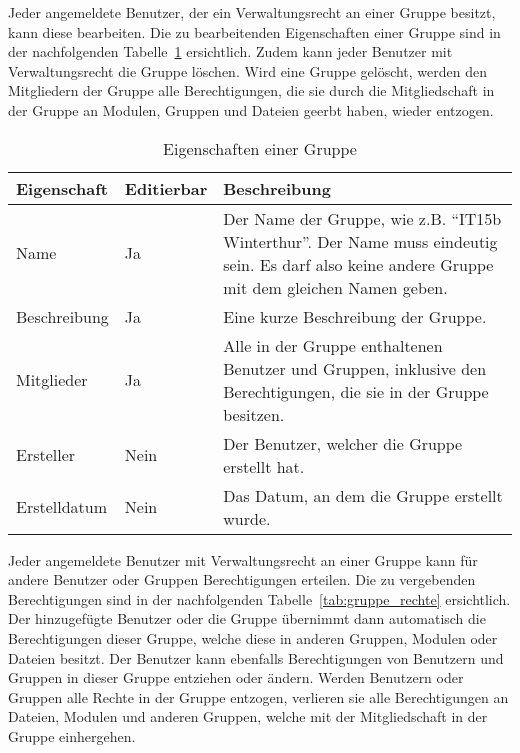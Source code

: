 Jeder angemeldete Benutzer, der ein Verwaltungsrecht an einer Gruppe besitzt, kann diese bearbeiten. Die zu bearbeitenden Eigenschaften einer Gruppe sind in der nachfolgenden Tabelle~\ref{tab:gruppe_eigenschaften} ersichtlich. Zudem kann jeder Benutzer mit Verwaltungsrecht die Gruppe löschen. Wird eine Gruppe gelöscht, werden den Mitgliedern der Gruppe alle Berechtigungen, die sie durch die Mitgliedschaft in der Gruppe an Modulen, Gruppen und Dateien geerbt haben, wieder entzogen.

\begin{table}[H]
\begin{tabularx}{\textwidth}{|l|l|X|} \hline
\textbf{Eigenschaft} &\textbf{Editierbar} & \textbf{Beschreibung} \\ \hline
Name				& Ja 	& Der Name der Gruppe, wie z.B. “IT15b Winterthur”. Der Name muss eindeutig sein. Es darf also keine andere Gruppe mit dem gleichen Namen geben.\\ \hline
Beschreibung		& Ja 	& Eine kurze Beschreibung der Gruppe.\\ \hline
Mitglieder			& Ja 	& Alle in der Gruppe enthaltenen Benutzer und Gruppen, inklusive den Berechtigungen, die sie in der Gruppe besitzen.\\ \hline
Ersteller	 		& Nein 	& Der Benutzer, welcher die Gruppe erstellt hat.\\ \hline
Erstelldatum		& Nein 	& Das Datum, an dem die Gruppe erstellt wurde.\\ \hline
\end{tabularx}
\caption{Eigenschaften einer Gruppe}
\label{tab:gruppe_eigenschaften}
\end{table}

Jeder angemeldete Benutzer mit Verwaltungsrecht  an einer Gruppe kann für andere Benutzer oder Gruppen  Berechtigungen erteilen.
Die zu vergebenden Berechtigungen sind in der nachfolgenden Tabelle~\ref{tab:gruppe_rechte} ersichtlich.
Der hinzugefügte Benutzer oder die Gruppe  übernimmt dann automatisch die Berechtigungen dieser Gruppe, welche diese in anderen Gruppen, Modulen oder Dateien besitzt.
Der Benutzer  kann ebenfalls Berechtigungen von Benutzern und Gruppen in dieser Gruppe entziehen oder ändern.
Werden Benutzern oder Gruppen alle Rechte in der Gruppe entzogen, verlieren sie alle Berechtigungen an Dateien, Modulen und anderen Gruppen, welche mit der Mitgliedschaft in der Gruppe einhergehen.


